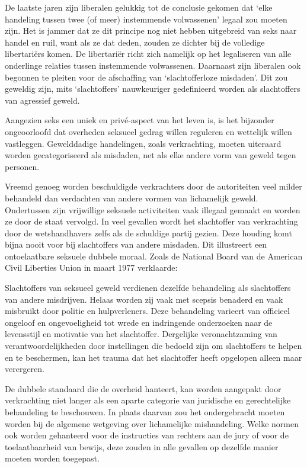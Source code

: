 \documentclass[
  a5paper,
  smalldemyvopaper,10pt,twoside,onecolumn,openright,extrafontsizes,hidelinks]{memoir}
\renewenvironment{quote}%
               {\list{}{\rightmargin=.6cm\leftmargin=.6cm}%
                \itshape \item[]}%
               {\endlist}
\begin{document}
De laatste jaren zijn liberalen gelukkig tot de conclusie gekomen dat
`elke handeling tussen twee (of meer) instemmende volwassenen' legaal
zou moeten zijn. Het is jammer dat ze dit principe nog niet hebben
uitgebreid van seks naar handel en ruil, want als ze dat deden, zouden
ze dichter bij de volledige libertariërs komen. De libertariër richt
zich namelijk op het legaliseren van alle onderlinge relaties tussen
instemmende volwassenen. Daarnaast zijn liberalen ook begonnen te
pleiten voor de afschaffing van `slachtofferloze misdaden'. Dit zou
geweldig zijn, mits `slachtoffers' nauwkeuriger gedefinieerd worden als
slachtoffers van agressief geweld.

Aangezien seks een uniek en privé-aspect van het leven is, is het
bijzonder ongeoorloofd dat overheden seksueel gedrag willen reguleren en
wettelijk willen vastleggen. Gewelddadige handelingen, zoals
verkrachting, moeten uiteraard worden gecategoriseerd als misdaden, net
als elke andere vorm van geweld tegen personen.

Vreemd genoeg worden beschuldigde verkrachters door de autoriteiten veel
milder behandeld dan verdachten van andere vormen van lichamelijk
geweld. Ondertussen zijn vrijwillige seksuele activiteiten vaak illegaal
gemaakt en worden ze door de staat vervolgd. In veel gevallen wordt het
slachtoffer van verkrachting door de wetshandhavers zelfs als de
schuldige partij gezien. Deze houding komt bijna nooit voor bij
slachtoffers van andere misdaden. Dit illustreert een ontoelaatbare
seksuele dubbele moraal. Zoals de National Board van de American Civil
Liberties Union in maart 1977 verklaarde:

\begin{quote}
Slachtoffers van seksueel geweld verdienen dezelfde behandeling als
slachtoffers van andere misdrijven. Helaas worden zij vaak met scepsis
benaderd en vaak misbruikt door politie en hulpverleners. Deze
behandeling varieert van officieel ongeloof en ongevoeligheid tot wrede
en indringende onderzoeken naar de levensstijl en motivatie van het
slachtoffer. Dergelijke veronachtzaming van verantwoordelijkheden door
instellingen die bedoeld zijn om slachtoffers te helpen en te
beschermen, kan het trauma dat het slachtoffer heeft opgelopen alleen
maar verergeren.
\end{quote}

De dubbele standaard die de overheid hanteert, kan worden aangepakt door
verkrachting niet langer als een aparte categorie van juridische en
gerechtelijke behandeling te beschouwen. In plaats daarvan zou het
ondergebracht moeten worden bij de algemene wetgeving over lichamelijke
mishandeling. Welke normen ook worden gehanteerd voor de instructies van
rechters aan de jury of voor de toelaatbaarheid van bewijs, deze zouden
in alle gevallen op dezelfde manier moeten worden toegepast.
\end{document}
